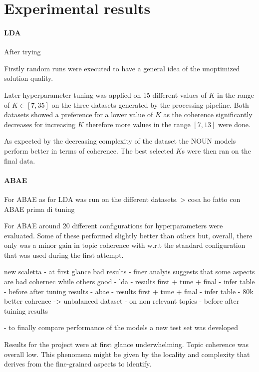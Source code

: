 \section{Experimental results}


\paragraph{LDA}
After trying

Firstly random runs were executed to have a general idea of the unoptimized solution quality.

Later hyperparameter tuning was applied on 15 different values of $K$ in the range of $K\in [7,35]$
on the three datasets generated by the processing pipeline.
Both datasets showed a preference for a lower value of $K$ as the coherence significantly decreases for
increasing $K$ therefore more values in the range $[7,13]$ were done.

As expected by the decreasing complexity of the dataset the NOUN models perform better in terms of coherence.
The best selected $K$s were then ran on the final data.

\paragraph{ABAE}
For ABAE as for LDA was run on the different datasets.
> cosa ho fatto con ABAE prima di tuning

For ABAE around 20 different configurations for hyperparameters were evaluated.
Some of these performed slightly better than others but, overall, there only was a minor gain in topic coherence with
w.r.t the standard configuration that was used during the first attempt.

new scaletta
- at first glance bad results
- finer analyis suggests that some aspects are bad cohernec while others good
- lda
    - results first + tune + final
    - infer table
    - before after tuning results
- abae
    - results first + tune + final
    - infer table
    - 80k better cohrence ->  unbalanced dataset
    - on non relevant topics
    - before after tuining results

- to finally compare performance of the models a new test set was developed

Results for the project were at first glance underwhelming.
Topic coherence was overall low.
This phenomena might be given by the locality and complexity that derives from the fine-grained aspects to identify.

